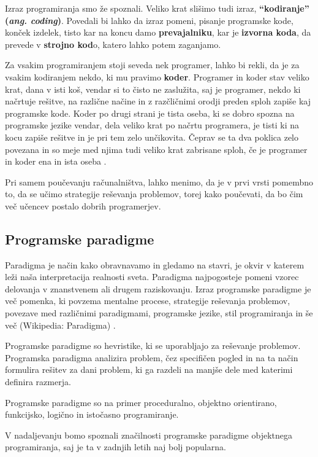 Izraz programiranja smo že spoznali. Veliko krat slišimo tudi izraz,
\textbf{``kodiranje'' (\emph{ang. coding})}. Povedali bi lahko da
izraz pomeni, pisanje programske kode, konček izdelek, tisto kar na
koncu damo \textbf{prevajalniku}, kar je \textbf{izvorna koda}, da
prevede v \textbf{strojno kod}o, katero lahko potem zaganjamo.

Za vsakim programiranjem stoji seveda nek programer, lahko bi rekli,
da je za vsakim kodiranjem nekdo, ki mu pravimo
\textbf{koder}. Programer in koder stav veliko krat, dana v isti koš,
vendar si to čisto ne zaslužita, saj je programer, nekdo ki načrtuje
rešitve, na različne načine in z razčličnimi orodji preden sploh
zapiše kaj programske kode. Koder po drugi strani je tista oseba, ki
se dobro spozna na programske jezike vendar, dela veliko krat po
načrtu programera, je tisti ki na kocu zapiše rešitve in je pri tem
zelo unčikovita. Čeprav se ta dva poklica zelo povezana in so meje med
njima tudi veliko krat zabrisane sploh, če je programer in koder ena
in ista oseba \cite{web:coder}.

Pri samem poučevanju računalništva, lahko menimo, da je v prvi vrsti
pomembno to, da se učimo strategije reševanja problemov, torej kako
poučevati, da bo čim več učencev postalo dobrih programerjev.

\subsection{Programske paradigme}
\label{sec:programske_paradigme}

Paradigma je način kako obravnavamo in gledamo na stavri, je okvir v
katerem leži naša interpretacija realnosti sveta. Paradigma
najpogosteje pomeni vzorec delovanja v znanstvenem ali drugem
raziskovanju.  Izraz programske paradigme je več pomenka, ki povzema
mentalne procese, strategije reševanja problemov, povezave med
različnimi paradigmami, programske jezike, stil programiranja in še
več (Wikipedia: Paradigma) \cite{guideTCS}.

Programske paradigme so hevristike, ki se uporabljajo za reševanje
problemov. Programska paradigma analizira problem, čez specifičen
pogled in na ta način formulira rešitev za dani problem, ki ga razdeli
na manjše dele med katerimi definira razmerja.

Programske paradigme so na primer proceduralno, objektno orientirano,
funkcijsko, logično in istočasno programiranje.

V nadaljevanju bomo spoznali značilnosti programske paradigme
objektnega programiranja, saj je ta v zadnjih letih naj bolj
popularna.

